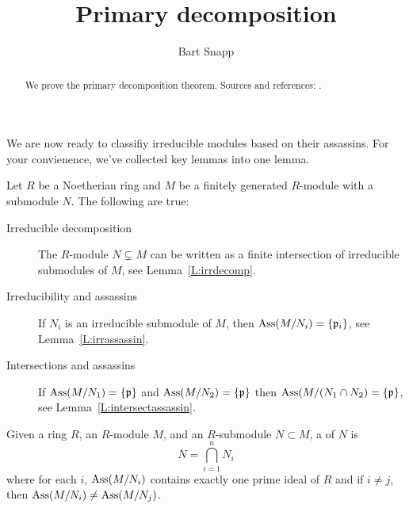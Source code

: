 \documentclass{ximera}
\author{Bart Snapp}
\title{Primary decomposition}
\begin{document}
\begin{abstract}
  We prove the primary decomposition theorem. Sources and references:
  \cite{sD2008,jpS2000}.
\end{abstract}
\maketitle

We are now ready to classifiy irreducible modules based on their
assassins. For your convienence, we've collected key lemmas into one lemma.

\begin{lemma}\label{L:biglempd}
  Let $R$ be a Noetherian ring and $M$ be a finitely generated
  $R$-module with a submodule $N$. The following are true:
  \begin{description}
    \item[Irreducible decomposition] The $R$-module $N\subsetneq M$
      can be written as a finite intersection of irreducible
      submodules of $M$, see Lemma~\ref{L:irrdecomp}.
    \item[Irreducibility and assassins] If $N_i$ is an irreducible
      submodule of $M$, then $\operatorname{Ass}(M/N_i)=\{\mathfrak{p}_i\}$, see
      Lemma~\ref{L:irrassassin}.
    \item[Intersections and assassins] If $\operatorname{Ass}(M/N_1) = \{\mathfrak{p}\}$ and
      $\operatorname{Ass}(M/N_2) = \{\mathfrak{p}\}$ then $\operatorname{Ass}(M/(N_1\cap N_2) = \{\mathfrak{p}\}$, see
      Lemma~\ref{L:intersectassassin}.
  \end{description}
\end{lemma}





\begin{definition}
  Given a ring $R$, an $R$-module $M$, and an $R$-submodule $N\subset
  M$, a  of $N$ is
  \[
  N = \bigcap_{i=1}^n N_i
  \]
  where for each $i$, $\operatorname{Ass}(M/N_i)$ contains exactly one prime ideal
  of $R$ and if $i\ne j$, then $\operatorname{Ass}(M/N_i) \ne \operatorname{Ass}(M/N_j)$.
\end{definition}
\end{document}
